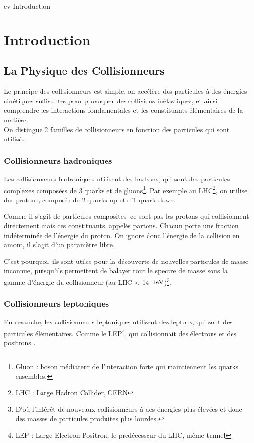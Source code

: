 ev Introduction

\chapter{Introduction}

\section{La Physique des Collisionneurs}

Le principe des collisionneurs est simple, on accélère des particules à des 
énergies cinétiques suffisantes pour provoquer des collisions inélastiques, et ainsi comprendre les interactions fondamentales et les constituants élémentaires de la matière.\\

On distingue 2 familles de collisionneurs en fonction des particules qui sont utilisés.

\subsection{Collisionneurs hadroniques}

Les collisionneurs hadroniques utilisent des hadrons, qui sont des 
particules complexes composées de 3 quarks et de gluons\footnote{Gluon : boson médiateur de l'interaction forte qui maintiennent les quarks ensembles.}. 
Par exemple au LHC\footnote{LHC : Large Hadron Collider, CERN}, on utilise des protons, composés de 2 quarks up et d'1 quark down. 

Comme il s'agit de particules composites, ce sont pas les protons qui collisionnent directement mais ces constituants, appelés partons. 
Chacun porte une fraction indéterminée de l'énergie du proton. 
On ignore donc l'énergie de la collision en amont, il s'agit d'un paramètre libre. 

C'est pourquoi, ils sont utiles pour la découverte de nouvelles particules de masse inconnue, puisqu'ils permettent de balayer tout le spectre de masse sous la gamme d'énergie du collisionneur (au LHC < 14 $\mathrm{TeV}$)\footnote{D'où l'intérêt de nouveaux collisionneurs à des énergies plus élevées et donc des masses de particules produites plus lourdes.}.

\subsection{Collisionneurs leptoniques}

En revanche, les collisionneurs leptoniques utilisent des leptons, qui sont des particules élémentaires. 
Comme le LEP\footnote{LEP : Large Electron-Positron, le prédécesseur du LHC, même tunnel}, qui collisionnait des électrons et des positrons \cite{cern:lep}.

